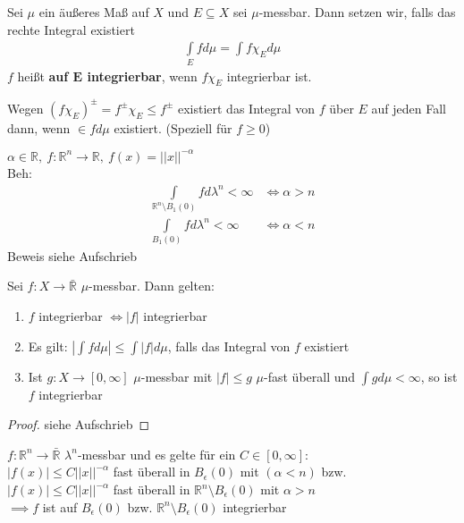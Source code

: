   \begin{definition}
    Sei $\mu$ ein äußeres Maß auf $X$ und $E \subseteq X$ sei $\mu$-messbar. Dann setzen wir, falls das rechte Integral existiert
    \begin{align*}
      \int\limits_E f d\mu = \int f \chi_E d\mu
    \end{align*}
    $f$ heißt \textbf{auf $\bm{E}$ integrierbar}, wenn $f \chi_E$ integrierbar ist.
  \end{definition}

  \begin{remark}
    Wegen $(f \chi_E)^{\pm} = f^{\pm} \chi_E \leq f^{\pm}$ existiert das Integral von $f$ über $E$ auf jeden Fall dann, wenn $\in f d\mu$ existiert. (Speziell für $f \geq 0$)
  \end{remark}

  \begin{example}
    $\alpha \in \mathbb{R}, \ f:\mathbb{R}^n \to \mathbb{R}, \ f(x) = ||x||^{-\alpha}$\\
    Beh: 
    \begin{align*}
      \int\limits_{\mathbb{R}^n \setminus B_1(0)} f d\lambda^n < \infty &\Leftrightarrow \alpha > n\\
      \int\limits_{B_1(0)} f d\lambda^n < \infty &\Leftrightarrow \alpha < n
    \end{align*}
    Beweis siehe Aufschrieb
  \end{example}

  \begin{theorem}
    Sei $f: X \to \bar{\mathbb{R}}$ $\mu$-messbar. Dann gelten:
    \begin{enumerate}[label=\roman*)]
      \item $f$ integrierbar $\Leftrightarrow |f|$ integrierbar
      \item Es gilt: $|\int f d\mu| \leq \int |f| d\mu$, falls das Integral von $f$ existiert
      \item Ist $g: X \to [0, \infty]$ $\mu$-messbar mit $|f| \leq g$ $\mu$-fast überall und $\int g d\mu < \infty$, so ist $f$ integrierbar 
    \end{enumerate}
  \end{theorem}

  \begin{proof}
    siehe Aufschrieb
  \end{proof}

  \begin{example}
    $f: \mathbb{R}^n \to \bar{\mathbb{R}}$ $\lambda^n$-messbar und es gelte für ein $C \in [0, \infty]$:\\
    $|f(x)| \leq C ||x||^{-\alpha}$ fast überall in $B_{\epsilon}(0)$ mit $(\alpha < n)$ bzw.\\
    $|f(x)| \leq C ||x||^{-\alpha}$ fast überall in $\mathbb{R}^n \setminus B_{\epsilon}(0)$ mit $\alpha > n$\\
    $\implies f$ ist auf $B_{\epsilon}(0)$ bzw. $\mathbb{R}^n \setminus B_{\epsilon}(0)$ integrierbar
  \end{example}

  